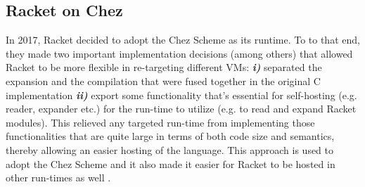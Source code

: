 \subsection{Racket on Chez}
\label{subsec:racketcs}

In 2017, Racket decided to adopt the Chez Scheme as its runtime. To to
that end, they made two important implementation decisions (among
others) that allowed Racket to be more flexible in re-targeting
different VMs: \textit{\textbf{i)}} separated the expansion and the
compilation that were fused together in the original C implementation
\textit{\textbf{ii)}} export some functionality that's essential for
self-hosting (e.g. reader, expander etc.) for the run-time to utilize
(e.g. to read and expand Racket modules). This relieved any targeted
run-time from implementing those functionalities that are quite large
in terms of both code size and semantics, thereby allowing an easier
hosting of the language. This approach is used to adopt the Chez
Scheme and it also made it easier for Racket to be hosted in other
run-times as well \cite{racket-on-chez-19}.

